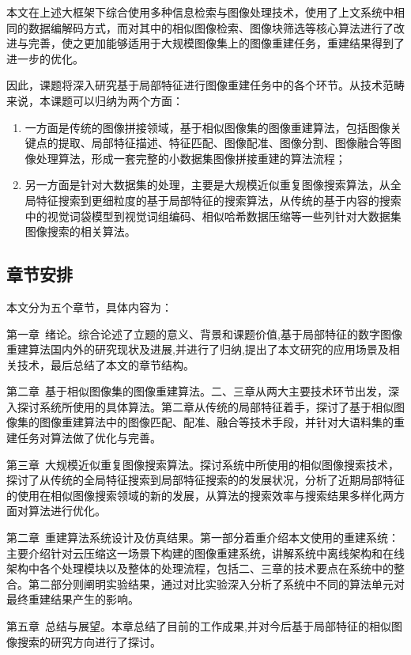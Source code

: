 本文在上述大框架下综合使用多种信息检索与图像处理技术，使用了上文系统中相同的数据编解码方式，而对其中的相似图像检索、图像块筛选等核心算法进行了改进与完善，使之更加能够适用于大规模图像集上的图像重建任务，重建结果得到了进一步的优化。

因此，课题将深入研究基于局部特征进行图像重建任务中的各个环节。从技术范畴来说，本课题可以归纳为两个方面：

\begin{enumerate}
\item 一方面是传统的图像拼接领域，基于相似图像集的图像重建算法，包括图像关键点的提取、局部特征描述、特征匹配、图像配准、图像分割、图像融合等图像处理算法，形成一套完整的小数据集图像拼接重建的算法流程；
\item 另一方面是针对大数据集的处理，主要是大规模近似重复图像搜索算法，从全局特征搜索到更细粒度的基于局部特征的搜索算法，从传统的基于内容的搜索中的视觉词袋模型到视觉词组编码、相似哈希数据压缩等一些列针对大数据集图像搜索的相关算法。
\end{enumerate}


\subsection{章节安排}
本文分为五个章节，具体内容为：

第一章\ 绪论。综合论述了立题的意义、背景和课题价值,基于局部特征的数字图像重建算法国内外的研究现状及进展,并进行了归纳,提出了本文研究的应用场景及相关技术，最后总结了本文的章节结构。

第二章\ 基于相似图像集的图像重建算法。二、三章从两大主要技术环节出发，深入探讨系统所使用的具体算法。第二章从传统的局部特征着手，探讨了基于相似图像集的图像重建算法中的图像匹配、配准、融合等技术手段，并针对大语料集的重建任务对算法做了优化与完善。

第三章\ 大规模近似重复图像搜索算法。探讨系统中所使用的相似图像搜索技术，探讨了从传统的全局特征搜索到局部特征搜索的的发展状况，分析了近期局部特征的使用在相似图像搜索领域的新的发展，从算法的搜索效率与搜索结果多样化两方面对算法进行优化。

第二章\ 重建算法系统设计及仿真结果。第一部分着重介绍本文使用的重建系统：主要介绍针对云压缩这一场景下构建的图像重建系统，讲解系统中离线架构和在线架构中各个处理模块以及整体的处理流程，包括二、三章的技术要点在系统中的整合。第二部分则阐明实验结果，通过对比实验深入分析了系统中不同的算法单元对最终重建结果产生的影响。

第五章\ 总结与展望。本章总结了目前的工作成果,并对今后基于局部特征的相似图像搜索的研究方向进行了探讨。

\ifx\usechapbib\empty
\nocite{BSTcontrol}


\fi
